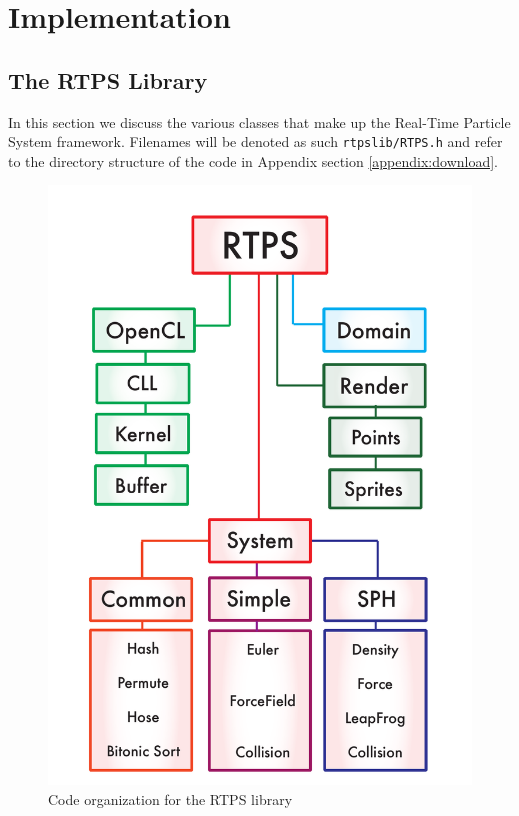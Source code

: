 \chapter{Implementation}

\section{The RTPS Library}

In this section we discuss the various classes that make up the Real-Time
Particle System framework. Filenames will be denoted as such \verb|rtpslib/RTPS.h|
and refer to the directory structure of the code in Appendix section \ref{appendix:download}.

\begin{figure}[!htc]
 		\centering
		\includegraphics[scale=0.4]{figures/rtps_flow.pdf}
        \caption{ Code organization for the RTPS library}
		\label{fig:flowchart}
\end{figure}





